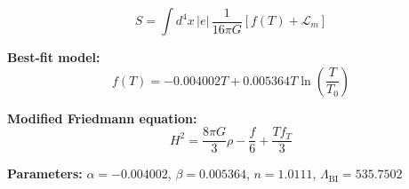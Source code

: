 
\begin{equation}
  S = \int d^4x \, |e| \, \frac{1}{16\pi G} \left[ f(T) + \mathcal{L}_m \right]
\end{equation}

\textbf{Best-fit model:}
\begin{equation}
  f(T) = -0.004002 T + 0.005364 T \ln\!\left(\frac{T}{T_0}\right)
\end{equation}

\textbf{Modified Friedmann equation:}
\begin{equation}
  H^2 = \frac{8\pi G}{3} \rho - \frac{f}{6} + \frac{T f_T}{3}
\end{equation}

\textbf{Parameters:}
$\alpha = -0.004002$, \quad
$\beta = 0.005364$, \quad
$n = 1.0111$, \quad
$\Lambda_{\text{BI}} = 535.7502$